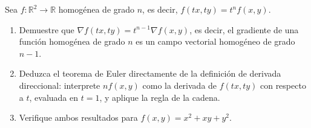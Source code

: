 Sea $f: \mathbb{R}^2 \to \mathbb{R}$ homogénea de grado $n$, es decir, $f(tx, ty) = t^n f(x, y)$.
\begin{enumerate}
    \item Demuestre que $\nabla f(tx, ty) = t^{n-1} \nabla f(x, y)$, es decir, el gradiente de una función homogénea de grado $n$ es un campo vectorial homogéneo de grado $n - 1$.
    \item Deduzca el teorema de Euler directamente de la definición de derivada direccional: interprete $nf(x,y)$ como la derivada de $f(tx,ty)$ con respecto a $t$, evaluada en $t = 1$, y aplique la regla de la cadena.
    \item Verifique ambos resultados para $f(x, y) = x^2 + xy + y^2$.
\end{enumerate}
